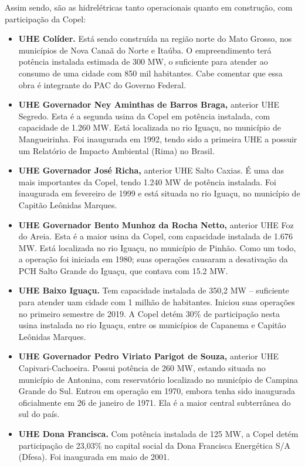 \documentclass[aprovado,numbers]{coppe}
\providecommand{\tightlist}{%
  \setlength{\itemsep}{0pt}\setlength{\parskip}{0pt}}
\begin{document}
  Assim sendo, são as hidrelétricas tanto operacionais quanto em construção, com participação da Copel:
  \begin{itemize}
  \tightlist
  \item
    \textbf{UHE Colíder.} Está sendo construída na região norte do Mato Grosso, nos municípios de Nova Canaã do Norte e Itaúba. O empreendimento terá potência instalada estimada de 300 MW, o suficiente para atender ao consumo de uma cidade com 850 mil habitantes. Cabe comentar que essa obra é integrante do PAC do Governo Federal.
  \item
    \textbf{UHE Governador Ney Aminthas de Barros Braga,} anterior UHE Segredo. Esta é a segunda usina da Copel em potência instalada, com capacidade de 1.260 MW. Está localizada no rio Iguaçu, no município de Mangueirinha. Foi inaugurada em 1992, tendo sido a primeira UHE a possuir um Relatório de Impacto Ambiental (Rima) no Brasil.
  \item
    \textbf{UHE Governador José Richa,} anterior UHE Salto Caxias. É uma das mais importantes da Copel, tendo 1.240 MW de potência instalada. Foi inaugurada em fevereiro de 1999 e está situada no rio Iguaçu, no município de Capitão Leônidas Marques.
  \item
    \textbf{UHE Governador Bento Munhoz da Rocha Netto,} anterior UHE Foz do Areia. Esta é a maior usina da Copel, com capacidade instalada de 1.676 MW. Está localizada no rio Iguaçu, no município de Pinhão. Como um todo, a operação foi iniciada em 1980; suas operações causaram a desativação da PCH Salto Grande do Iguaçu, que contava com 15.2 MW.
  \item
    \textbf{UHE Baixo Iguaçu.} Tem capacidade instalada de 350,2 MW -- suficiente para atender uam cidade com 1 milhão de habitantes. Iniciou suas operações no primeiro semestre de 2019. A Copel detém 30\% de participação nesta usina instalada no rio Iguaçu, entre os municípios de Capanema e Capitão Leônidas Marques.
  \item
    \textbf{UHE Governador Pedro Viriato Parigot de Souza,} anterior UHE Capivari-Cachoeira. Possui potência de 260 MW, estando situada no município de Antonina, com reservatório localizado no município de Campina Grande do Sul. Entrou em operação em 1970, embora tenha sido inaugurada oficialmente em 26 de janeiro de 1971. Ela é a maior central subterrânea do sul do país.
  \item
    \textbf{UHE Dona Francisca.} Com potência instalada de 125 MW, a Copel detém participação de 23,03\% no capital social da Dona Francisca Energética S/A (Dfesa). Foi inaugurada em maio de 2001.

\end{itemize}
\end{document}
